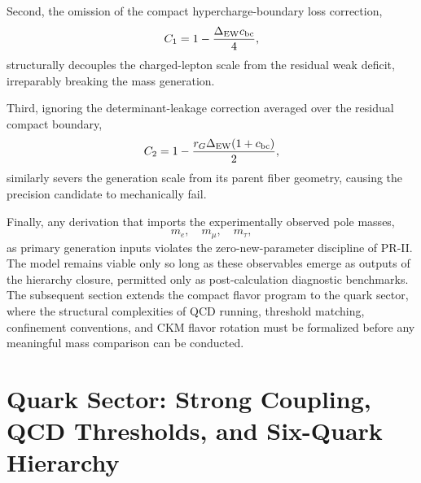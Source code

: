 \documentclass[11pt]{article}
\begin{document}
Second, the omission of the compact hypercharge-boundary loss correction,
\begin{equation}
C_1
=
1-\frac{\Delta_{\rm EW}c_{\rm bc}}{4},
\end{equation}
structurally decouples the charged-lepton scale from the residual weak deficit, irreparably breaking the mass generation.

Third, ignoring the determinant-leakage correction averaged over the residual compact boundary,
\begin{equation}
C_2
=
1-
\frac{
r_G\Delta_{\rm EW}(1+c_{\rm bc})
}{2},
\end{equation}
similarly severs the generation scale from its parent fiber geometry, causing the precision candidate to mechanically fail.

Finally, any derivation that imports the experimentally observed pole masses,
\begin{equation}
m_e,
\quad
m_\mu,
\quad
m_\tau,
\end{equation}
as primary generation inputs violates the zero-new-parameter discipline of PR-II. The model remains viable only so long as these observables emerge as outputs of the hierarchy closure, permitted only as post-calculation diagnostic benchmarks. The subsequent section extends the compact flavor program to the quark sector, where the structural complexities of QCD running, threshold matching, confinement conventions, and CKM flavor rotation must be formalized before any meaningful mass comparison can be conducted.

\section{Quark Sector: Strong Coupling, QCD Thresholds, and Six-Quark Hierarchy}
\label{sec:pr2_quark_qcd_six_quark_hierarchy}
\end{document}
